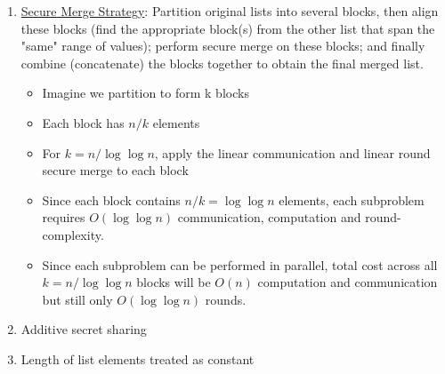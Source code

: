 \begin{enumerate}
\begin{itemize}
    \end{itemize}
    \item \underline{Secure Merge Strategy}: Partition original lists into several blocks, then align these blocks (find the appropriate block(s) from the other list that span the "same" range of values); perform secure merge on these blocks; and finally combine (concatenate) the blocks together to obtain the final merged list.
    \begin{itemize}
        \item Imagine we partition to form k blocks
        \item Each block has $n/k$ elements
        \item For $k = n/\log \log n$, apply the linear communication and linear round secure merge to each block
        \item Since each block contains $n/k = \log \log n$ elements, each subproblem requires $O(\log \log n)$ communication, computation and round-complexity.
        \item Since each subproblem can be performed in parallel, total cost across all $k = n/\log \log n$ blocks will be $O(n)$ computation and communication but still only $O(\log \log n)$ rounds.
    \end{itemize}
    \item Additive secret sharing
    \item Length of list elements treated as constant
\end{enumerate}




%
